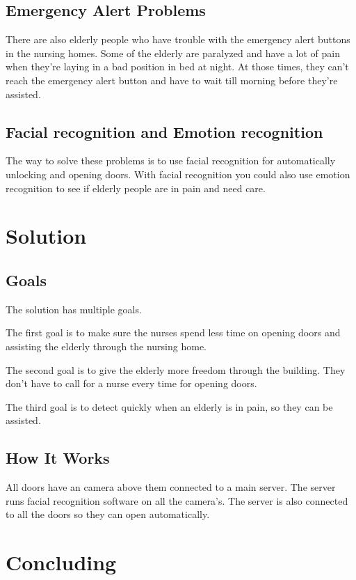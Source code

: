 \documentclass[14pt, a4paper]{extarticle}
\begin{document}
	\subsection{Emergency Alert Problems}
	There are also elderly people who have trouble with the emergency alert buttons in the nursing homes. Some of the elderly are paralyzed and have a lot of pain when they're laying in a bad position in bed at night. At those times, they can't reach the emergency alert button and have to wait till morning before they're assisted.
	
	\subsection{Facial recognition and Emotion recognition}
	The way to solve these problems is to use facial recognition for automatically unlocking and opening doors. With facial recognition you could also use emotion recognition to see if elderly people are in pain and need care. 
	
	\newpage
	\section{Solution}
	\subsection{Goals}
	The solution has multiple goals. 
	
	\vspace{5mm}
	The first goal is to make sure the nurses spend less time on opening doors and assisting the elderly through the nursing home.
	
	
	The second goal is to give the elderly more freedom through the building. They don't have to call for a nurse every time for opening doors.
	
	
	The third goal is to detect quickly when an elderly is in pain, so they can be assisted.
	
	\subsection{How It Works}
	All doors have an camera above them connected to a main server. The server runs facial recognition software on all the camera's. The server is also connected to all the doors so they can open automatically.
	
	\newpage
	\section{Concluding}
	
	\newpage
	
	
	
	
\end{document}
